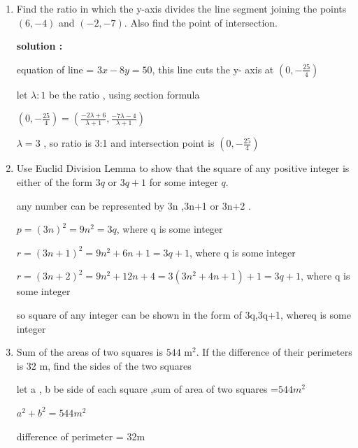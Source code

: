 \begin{enumerate}[label=\thesubsection.\arabic*, ref=\thesubsection.\theenumi]
\solution

let fraction be $\frac{x}{y} \implies \frac{x-1}{y}=\frac{1}{3}$

\begin{equation}
3x-y=4  \tag{32.1}
\end{equation}

$\frac{x}{y+8}=\frac{1}{4} $

\begin{equation}
    4x-y=8 \tag{32.2}
\end{equation}

\item  Find the ratio in which the y-axis divides the line segment joining the points $(6, -4)$ and $(-2, -7)$. Also find the point of intersection. 

\textbf{solution :}

equation of line = $3x-8y=50$, this line cuts the y- axis at $(0,-\frac{25}{4})$

let $\lambda :1 $ be the ratio , using section formula 

$(0,-\frac{25}{4})=\left( \frac{-2\lambda + 6}{\lambda +1} ,\frac{-7\lambda -4}{\lambda +1}\right) $

$\lambda=3 $ , so ratio is 3:1 and intersection point is $(0,-\frac{25}{4})$

\item Use Euclid Division Lemma to show that the square of any positive integer is either of the form $3q$ or $3q+1$ for some integer $q$.

\solution

any number can be represented by 3n ,3n+1 or 3n+2 .

$p=(3n)^2 = 9n^2 =3q $, where q is some integer 

$r= (3n +1)^2 = 9n^2+6n +1= 3q+1 $, where q is some integer 

$r=(3n+2)^2= 9n^2+ 12n+4= 3(3n^2+4n+1)+1= 3q+1$, where q is some integer 

so square of any integer can be shown in the form of 3q,3q+1, whereq is some integer 

\item  Sum of the areas of two squares is $544\text{ m}^{2}$. If the difference of their perimeters is 32 m, find the sides of the two squares

\solution

let a , b be side of each square ,sum of area of two squares =$544m^2$

$a^2+b^2 = 544m^2$

difference of perimeter = 32m


\end{enumerate}
